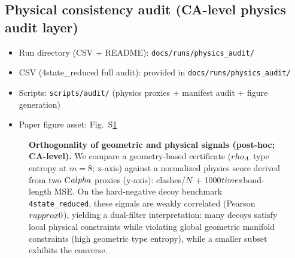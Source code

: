 \subsection*{Physical consistency audit (CA-level physics audit layer)}
\begin{itemize}
  \item Run directory (CSV + README): \texttt{docs/runs/physics\_audit/}
  \item CSV (4state\_reduced full audit): provided in \texttt{docs/runs/physics\_audit/}
  \item Scripts: \texttt{scripts/audit/} (physics proxies + manifest audit + figure generation)
  \item Paper figure asset: Fig.~S\ref{fig:physics_audit}
\end{itemize}

\begin{figure}[t]
  \centering
  \caption{\textbf{Orthogonality of geometric and physical signals (post-hoc; CA-level).} We compare a geometry-based certificate ($\\rho_A$ type entropy at $m=8$; x-axis) against a normalized physics score derived from two C$\\alpha$ proxies (y-axis): clashes/$N$ + 1000$\\times$bond-length MSE. On the hard-negative decoy benchmark \texttt{4state\_reduced}, these signals are weakly correlated (Pearson $r\\approx 0$), yielding a dual-filter interpretation: many decoys satisfy local physical constraints while violating global geometric manifold constraints (high geometric type entropy), while a smaller subset exhibits the converse.}
  \label{fig:physics_audit}
\end{figure}

